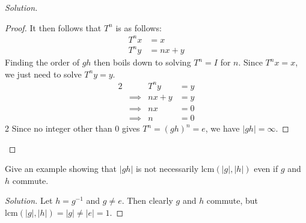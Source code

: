 \documentclass[12pt]{article}
\newenvironment{problem}[2][Problem]{\begin{trivlist}
\item[\hskip \labelsep {\bfseries #1}\hskip \labelsep {\bfseries #2.}]}{\end{trivlist}}
\newcommand{\lcm}[1]{\text{lcm}(#1)}
\newenvironment{solution}
  {\renewcommand\qedsymbol{$\blacksquare$}\begin{proof}[Solution]}
{\end{proof}}
\begin{document}
\begin{problem}{1.12}
\begin{solution}
\begin{proof}
      It then follows that $T^n$ is as follows:
      \begin{align*}
        T^nx &= x \\
        T^ny &= nx + y
      \end{align*}
      Finding the order of $gh$ then boils down to solving 
      $T^n=I$ for $n$. Since $T^nx=x$, we just need to solve 
      $T^ny=y$.
      \begin{alignat*}{2}
        & & T^ny &= y \\
        &\implies &nx + y &= y \\
        &\implies &nx &= 0 \\
        &\implies &n &= 0 
      \end{alignat*}{2}
    Since no integer other than 0 gives $T^n=(gh)^n=e$, we have $|gh|=\infty$.
    \end{proof}
  \end{solution}
\end{problem}
\begin{problem}{1.13}
  Give an example showing that $|gh|$ is not necessarily $\lcm{|g|,|h|}$
  even if $g$ and $h$ commute.
\end{problem}
\begin{solution}
  Let $h=g^{-1}$ and $g\neq e$.
  Then clearly $g$ and $h$ commute, but\\ $\lcm{|g|,|h|}=|g|\neq|e|=1$.
\end{solution}
\end{document}
